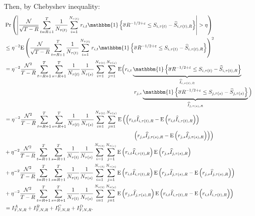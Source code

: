 Then, by Chebyshev inequality:
\begin{align}
& \Pr \left( \left \vert \frac{\mathcal{N}}{\sqrt{T-R}}\sum_{t=R+1}^{T} \frac{1 }{N_{\tau(t)}} \sum_{i=1}^{N_{\tau(t)}} r_{i,t} \mathbbm{1} \left\{ \overline{\sigma }R^{-1/2+\varepsilon} \leq S_{i,\tau(t) }-\widehat{S}_{i,\tau(t),R} \right\} \right \vert >\eta \right) \\
&\leq \eta^{-2}\mathrm{E}\left( \frac{\mathcal{N}}{\sqrt{T-R}} \sum_{t=R+1}^{T}\frac{1}{N_{\tau(t)}} \sum_{i=1}^{N_{\tau(t)}}r_{i,t} \mathbbm{1} \left\{ \overline{\sigma }R^{-1/2+\varepsilon} \leq S_{i,\tau(t) }-\widehat{S}_{i,\tau(t),R} \right\} \right)^{2} \notag \\
&= \eta^{-2} \frac{\mathcal{N}^{2}}{T-R}\sum_{t=R+1}^{T}\sum_{s=R+1}^{T} \frac{1}{N_{\tau(t)}} \frac{1}{N_{\tau(s)}} \sum_{i=1}^{N_{\tau(t)}} \sum_{j=1}^{N_{\tau(s)}} \mathrm{E} \Big( r_{i,t}  \underbrace{\mathbbm{1} \left\{ \overline{\sigma } R^{-1/2+\varepsilon} \leq S_{i,\tau(t) }-\widehat{S}_{i,\tau(t),R} \right\} }_{\widehat{I}_{i,\tau(t),R}} \notag \\
& \hspace{8.4cm} r_{j,s} \underbrace{\mathbbm{1} \left\{ \overline{\sigma} R^{-1/2+\varepsilon} \leq S_{j,\tau(s) }-\widehat{S}_{j,\tau(s)} \right\} }_{\widehat{I}_{j,\tau(s),R}} \Big) \notag \\
&= \eta^{-2} \frac{\mathcal{N}^{2}}{T-R}\sum_{t=R+1}^{T}\sum_{s=R+1}^{T} \frac{1}{N_{\tau(t)}}\frac{1}{N_{\tau(s)}} \sum_{i=1}^{N_{\tau(t)}}\sum_{j=1}^{N_{\tau(s)}} \mathrm{E}\left( \left( r_{i,t}\widehat{I}_{i,\tau(t),R}-\mathrm{E}\left( r_{i,t}\widehat{I}_{i,\tau(t),R} \right) \right) \right. \notag \\
& \hspace{8.3cm} \left. \left(r_{j,s}\widehat{I}_{j,\tau(s),R}-\mathrm{E} \left( r_{j,s} \widehat{I}_{j,\tau(s),R}\right) \right) \right) \notag \\
& +\eta^{-2} \frac{\mathcal{N}^{2}}{T-R}\sum_{t=R+1}^{T} \sum_{s=R+1}^{T} \frac{1}{N_{\tau(t)}} \frac{1}{N_{\tau(s)}} \sum_{i=1}^{N_{\tau(t)}}\sum_{j=1}^{N_{\tau(s)}}\mathrm{E}\left( r_{i,t}\widehat{I}_{i,\tau(t),R}\right) \mathrm{E}\left( r_{j,s}\widehat{I}_{j,\tau(s),R}\right) \notag \\
& +\eta^{-2} \frac{\mathcal{N}^{2}}{T-R}\sum_{t=R+1}^{T} \sum_{s=R+1}^{T} \frac{1}{N_{\tau(t)}} \frac{1}{N_{\tau(s)}}
\sum_{i=1}^{N_{\tau(t)}}\sum_{j=1}^{N_{\tau(s)}}\mathrm{E}\left( r_{i,t}\widehat{I}_{i,\tau(t),R}\right) \mathrm{E}\left( r_{j,s}\widehat{I}_{j,\tau(s),R}- \mathrm{E}\left( r_{j,s}\widehat{I}_{j,\tau(s),R}\right) \right) \notag \\
& +\eta ^{-2}\frac{\mathcal{N}^{2}}{T-R}\sum_{t=R+1}^{T} \sum_{s=R+1}^{T} \frac{1}{N_{\tau(t)}} \frac{1}{N_{\tau(s)}}
\sum_{i=1}^{N_{\tau(t)}} \sum_{j=1}^{N_{\tau(s)}}\mathrm{E}\left( r_{j,s}\widehat{I}_{j,\tau(s),R}\right) \mathrm{E}\left( r_{i,t}\widehat{I}_{i,\tau(t),R}- \mathrm{E}\left( r_{i,t}\widehat{I}_{i,\tau(t),R}\right)
\right) \notag \\
&= I^A_{T,N,R}+I^B_{T,N,R}+I^C_{T,N,R}+I^D_{T,N,R}. \notag
\end{align}
